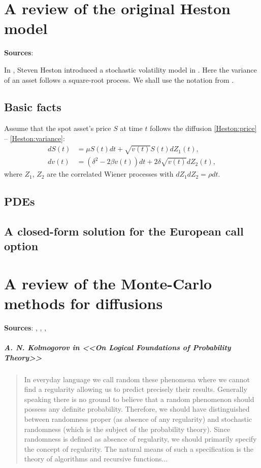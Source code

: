 \chapter{A review of the original Heston model}
    \textbf{Sources}: \cite{Gatheral2012}

    In \citeyear{Heston1993}, Steven Heston introduced a stochastic volatility model in \cite{Heston1993}. 
    Here the variance of an asset follows a square-root process. We shall use the notation from \cite{Zhitlukhin2022}.
    \section{Basic facts}
        Assume that the spot asset's price $S$ at time $t$ follows the diffusion \eqref{Heston:price} -- \eqref{Heston:variance}:
        \begin{align}
            dS(t) & = \mu S(t)dt + \sqrt{v(t)} S(t) dZ_1(t), \label{Heston:price}\\
            dv(t) & = \left(\delta^2 - 2\beta v(t)\right) dt + 2\delta \sqrt{v(t)} dZ_2(t), \label{Heston:variance}
        \end{align}
        where $Z_1$, $Z_2$ are the correlated Wiener processes with $dZ_1dZ_2 = \rho dt$.
    \section{PDEs}
    \section{A closed-form solution for the European call option}
\chapter{A review of the Monte-Carlo methods for diffusions}
    \textbf{Sources}: \cite{Kolmogorov1983}, \cite{Zhitlukhin2022}, \cite{KobelkovKitapbayev2022}, \cite{Kloeden1992}
        \paragraph*{A. N. Kolmogorov in <<On Logical Foundations of Probability Theory>>}
        \begin{quote}
        In everyday language we call random these phenomena where we cannot find a regularity allowing us to predict precisely their results. Generally speaking there is no ground to believe that a random phenomenon should possess any definite probability. Therefore, we should have distinguished between randomness proper
        (as absence of any regularity) and stochastic randomness (which is the subject of the probability theory).
        Since randomness is defined as absence of regularity, we should
        primarily specify the concept of regularity. The natural means of such a specification is the theory of algorithms and recursive functions...
        \end{quote}
